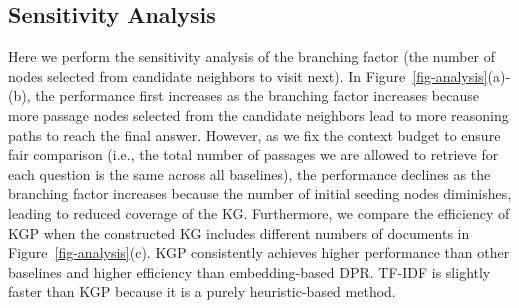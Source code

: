 \vspace{-1ex}
\subsection{Sensitivity Analysis}\label{sec-sensi}
Here we perform the sensitivity analysis of the branching factor (the number of nodes selected from candidate neighbors to visit next). In Figure~\ref{fig-analysis}(a)-(b), the performance first increases as the branching factor increases because more passage nodes selected from the candidate neighbors lead to more reasoning paths to reach the final answer. However, as we fix the context budget to ensure fair comparison (i.e., the total number of passages we are allowed to retrieve for each question is the same across all baselines), the performance declines as the branching factor increases because the number of initial seeding nodes diminishes, leading to reduced coverage of the KG. Furthermore, we compare the efficiency of KGP when the constructed KG includes different numbers of documents in Figure~\ref{fig-analysis}(c). KGP consistently achieves higher performance than other baselines and higher efficiency than embedding-based DPR. TF-IDF is slightly faster than KGP because it is a purely heuristic-based method. 


